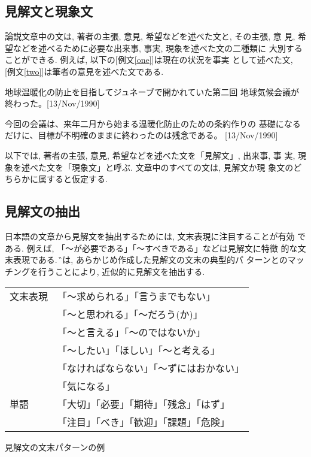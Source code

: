 \subsection{見解文と現象文}
論説文章中の文は, 著者の主張, 意見, 希望などを述べた文と, その主張, 意
見, 希望などを述べるために必要な出来事, 事実, 現象を述べた文の二種類に
大別することができる. 例えば, 以下の[例文\ref{one}]は現在の状況を事実
として述べた文, [例文\ref{two}]は筆者の意見を述べた文である. 

\begin{sample}
\item 地球温暖化の防止を目指してジュネーブで開かれていた第二回
地球気候会議が終わった。[13/Nov/1990]\label{one}
\item 今回の会議は、来年二月から始まる温暖化防止のための条約作りの
基礎になるだけに、目標が不明確のままに終わったのは残念である。
[13/Nov/1990]\label{two}
\end{sample}

以下では, 著者の主張, 意見, 希望などを述べた文を「見解文」, 出来事, 事
実, 現象を述べた文を「現象文」と呼ぶ. 文章中のすべての文は, 見解文か現
象文のどちらかに属すると仮定する. 

\subsection{見解文の抽出}
日本語の文章から見解文を抽出するためには, 文末表現に注目することが有効
である. 例えば, 「〜が必要である」「〜すべきである」などは見解文に特徴
的な文末表現である. \G では, あらかじめ作成した見解文の文末の典型的パ
ターンとのマッチングを行うことにより, 近似的に見解文を抽出する. 

\begin{center}
\begin{tabular}{|l|l|}
\hline
文末表現
 & 「〜求められる」「言うまでもない」\\
 & 「〜と思われる」「〜だろう(か)」 \\
 & 「〜と言える」「〜のではないか」\\
 & 「〜したい」「ほしい」「〜と考える」 \\
 & 「なければならない」「〜ずにはおかない」\\
 & 「気になる」\\
\hline
単語
 & 「大切」「必要」「期待」「残念」「はず」 \\
 & 「注目」「べき」「歓迎」「課題」「危険」 \\
\hline
\end{tabular}
\caption{見解文の文末パターンの例}
\end{center}

